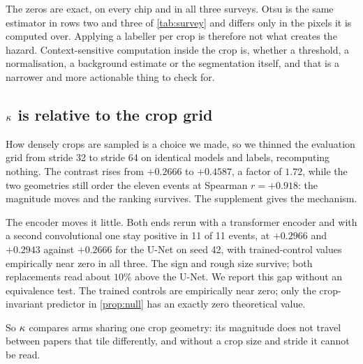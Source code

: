 The zeros are exact, on every chip and in all three surveys. Otsu is the same
estimator in rows two and three of \cref{tab:survey} and differs only in the pixels it
is computed over. Applying a labeller per crop is therefore not what creates the
hazard. Context-sensitive computation inside the crop is, whether a threshold, a
normalisation, a background estimate or the segmentation itself, and that is a
narrower and more actionable thing to check for.

\subsection{\texorpdfstring{$\kappa$}{kappa} is relative to the crop grid}
\label{sec:grid}

How densely crops are sampled is a choice we made, so we thinned the evaluation grid
from stride 32 to stride 64 on identical models and labels, recomputing nothing. The
contrast rises from $+0.2666$ to $+0.4587$, a factor of $1.72$, while the two
geometries still order the eleven events at Spearman $r = +0.918$: the magnitude moves
and the ranking survives. The supplement gives the mechanism.

The encoder moves it little. Both ends rerun with a transformer encoder and with a
second convolutional one stay positive in 11 of 11 events, at $+0.2966$ and $+0.2943$
against $+0.2666$ for the U-Net on seed 42, with trained-control values empirically
near zero in all three. The sign and rough size survive; both replacements read about $10\%$
above the U-Net. We report this gap without an equivalence test. The trained controls are
empirically near zero; only the crop-invariant predictor in \cref{prop:null} has an
exactly zero theoretical value.

So $\kappa$ compares arms sharing one crop geometry: its magnitude does not travel
between papers that tile differently, and without a crop size and stride it cannot
be read.
